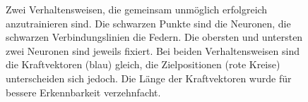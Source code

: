 \begin{figure}
    \centering
    \caption{Zwei Verhaltensweisen, die gemeinsam unmöglich erfolgreich anzutrainieren sind. Die schwarzen Punkte sind die Neuronen, die schwarzen Verbindungslinien die Federn. Die obersten und untersten zwei Neuronen sind jeweils fixiert. Bei beiden Verhaltensweisen sind die Kraftvektoren (blau) gleich, die Zielpositionen (rote Kreise) unterscheiden sich jedoch. Die Länge der Kraftvektoren wurde für bessere Erkennbarkeit verzehnfacht.}
    \label{fig:impossibletraining}
\end{figure}

